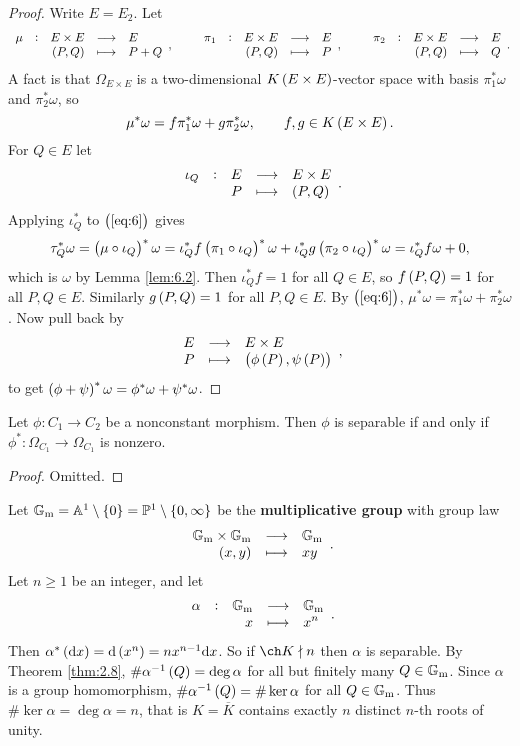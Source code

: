 \begin{proof}
Write $ E = E_2 $. Let
$$ \function[\mu]{E \times E}{E}{\br{P, Q}}{P + Q}, \qquad \function[\pi_1]{E \times E}{E}{\br{P, Q}}{P}, \qquad \function[\pi_2]{E \times E}{E}{\br{P, Q}}{Q}. $$
A fact is that $ \Omega_{E \times E} $ is a two-dimensional $ K\br{E \times E} $-vector space with basis $ \pi_1^*\omega $ and $ \pi_2^*\omega $, so
\begin{equation}
\label{eq:6}
\mu^*\omega = f\pi_1^*\omega + g\pi_2^*\omega, \qquad f, g \in K\br{E \times E}.
\end{equation}
For $ Q \in E $ let
$$ \function[\iota_Q]{E}{E \times E}{P}{\br{P, Q}}. $$
Applying $ \iota_Q^* $ to $ \br{\ref{eq:6}} $ gives
$$ \tau_Q^*\omega = \br{\mu \circ \iota_Q}^*\omega = \iota_Q^*f\br{\pi_1 \circ \iota_Q}^*\omega + \iota_Q^*g\br{\pi_2 \circ \iota_Q}^*\omega = \iota_Q^*f\omega + 0, $$
which is $ \omega $ by Lemma \ref{lem:6.2}. Then $ \iota_Q^*f = 1 $ for all $ Q \in E $, so $ f\br{P, Q} = 1 $ for all $ P, Q \in E $. Similarly $ g\br{P, Q} = 1 $ for all $ P, Q \in E $. By $ \br{\ref{eq:6}} $, $ \mu^*\omega = \pi_1^*\omega + \pi_2^*\omega $. Now pull back by
$$ \function{E}{E \times E}{P}{\br{\phi\br{P}, \psi\br{P}}}, $$
to get $ \br{\phi + \psi}^*\omega = \phi^*\omega + \psi^*\omega $.
\end{proof}

\pagebreak

\begin{lemma}
Let $ \phi : C_1 \to C_2 $ be a nonconstant morphism. Then $ \phi $ is separable if and only if $ \phi^* : \Omega_{C_1} \to \Omega_{C_1} $ is nonzero.
\end{lemma}

\begin{proof}
Omitted.
\end{proof}


\begin{example*}
Let $ \GG_\m = \AA^1 \setminus \cbr{0} = \PP^1 \setminus \cbr{0, \infty} $ be the \textbf{multiplicative group} with group law
$$ \function{\GG_\m \times \GG_\m}{\GG_\m}{\br{x, y}}{xy}. $$
Let $ n \ge 1 $ be an integer, and let
$$ \function[\alpha]{\GG_\m}{\GG_\m}{x}{x^n}. $$
Then $ \alpha^*\br{\d x} = \d\br{x^n} = nx^{n - 1}\d x $. So if $ \ch K \nmid n $ then $ \alpha $ is separable. By Theorem \ref{thm:2.8}, $ \#\alpha^{-1}\br{Q} = \deg \alpha $ for all but finitely many $ Q \in \mathbb{G}_{\mathrm{m}} $. Since $ \alpha $ is a group homomorphism, $ \#\alpha^{-1}\br{Q} = \#\ker \alpha $ for all $ Q \in \mathbb{G}_{\mathrm{m}} $. Thus $ \#\ker \alpha = \deg \alpha = n $, that is $ K = \overline{K} $ contains exactly $ n $ distinct $ n $-th roots of unity.
\end{example*}

